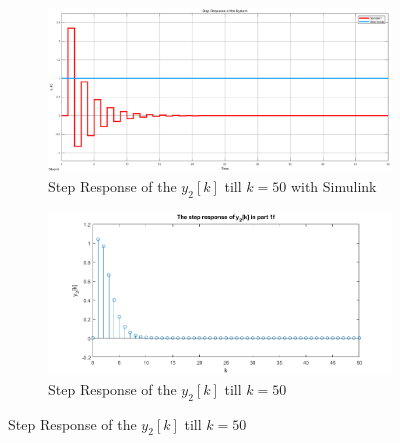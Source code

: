\documentclass[a4paper,12pt]{article}
\begin{document}
\begin{enumerate}
\begin{enumerate}
		\begin{figure}[H]
			\setlength{\unitlength}{\textwidth} 
			\centering
			\begin{subfigure}{.5\textwidth}
				\centering
				\includegraphics[width=0.48\unitlength]{images/1gb}
				\caption{\label{fig:sb1} Step Response of the $y_2[k]$ till $k=50$ with Simulink }
			\end{subfigure}%
			\begin{subfigure}{.5\textwidth}
				\centering
				\includegraphics[width=0.48\unitlength]{images/1gba}
				\caption{\label{fig:sb2} Step Response of the $y_2[k]$ till $k=50$ }
			\end{subfigure}
		\end{figure}
	
	 	
	\end{enumerate}
\end{enumerate}
	
\end{document}
